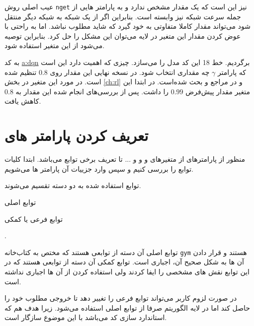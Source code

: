 عیب اصلی روش \texttt{nget} نیز این است که یک مقدار مشخص ندارد و به پارامتر هایی از جمله سرعت شبکه نیز وابسته است. بنابراین اگر از یک شبکه به شبکه دیگر منتقل شود می‌تواند مقدار کاملا متفاوتی به خود گیرد که شاید مطلوب نباشد. اما به راحتی با عوض کردن مقدار این متغیر در لایه  می‌توان این مشکل را حل کرد. بنابراین توصیه می‌شود از این متغیر استفاده شود.



به کد 
\hyperref[code:dqn.py]{\gls{a:dqn}}
برگردیم.
خط 18 این کد مدل را می‌سازد. چیزی که اهمیت دارد این است که پارامتر $\gamma$ چه مقداری انتخاب شود. در نسخه نهایی این مقدار روی $0.8$ تنظیم شده است. در مورد این متغیر در بخش \ref{ch:rl} و در مراجع \cite{Sutton1998} و  \cite{uclRL} بحث شده‌است.
در ابتدا این متغیر مقدار پیش‌فرض $0.99$ را داشت. پس از بررسی‌های انجام شده این مقدار به $0.8$ کاهش یافت.

\section{تعریف کردن پارامتر های }
منظور از پارامتر‌های  از متغیر‌های  و  و  و ... تا تعریف برخی توابع می‌باشد. 
ابتدا کلیات توابع را بررسی کنیم و سپس وارد جزییات آن پارامتر ها می‌شویم.

توابع استفاده شده به دو دسته تقسیم می‌شوند.
\begin{alphinline}
	\item توابع اصلی 
	\item  توابع فرعی یا کمکی
\end{alphinline}.

توابع اصلی آن دسته از توابعی هستند که مختص به کتاب‌خانه \texttt{gym} هستند و قرار دادن آن ها به شکل صحیح آن، اجباری است. توابع کمکی آن دسته از توابعی هستند که در این توابع نقش های مشخصی را ایفا کردند ولی استفاده کردن از آن ها اجباری نداشته است. 

\begin{note}
	در صورت لزوم کاربر می‌تواند توابع فرعی را تغییر دهد تا خروجی مطلوب خود را حاصل کند اما در لایه الگوریتم صرفا از توابع اصلی استفاده می‌شود. زیرا هدف هم که استاندارد سازی کد می‌باشد با این موضوع سازگار است.
\end{note}



